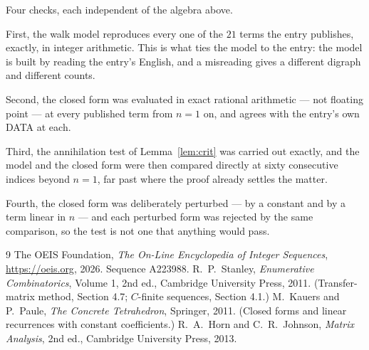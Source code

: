 \documentclass[11pt,a4paper]{article}
\theoremstyle{plain}
\theoremstyle{definition}
\begin{document}
Four checks, each independent of the algebra above.

First, the walk model reproduces every one of the $21$ terms the entry publishes,
exactly, in integer arithmetic. This is what ties the model to the entry: the model is built
by reading the entry's English, and a misreading gives a different digraph and different
counts.

Second, the closed form was evaluated in exact rational arithmetic --- not floating point ---
at every published term from $n=1$ on, and agrees with the entry's own DATA at each.

Third, the annihilation test of Lemma~\ref{lem:crit} was carried out exactly, and the model
and the closed form were then compared directly at sixty consecutive indices beyond
$n=1$, far past where the proof already settles the matter.

Fourth, the closed form was deliberately perturbed --- by a constant and by a term linear in
$n$ --- and each perturbed form was rejected by the same comparison, so the test is not one
that anything would pass.

\begin{thebibliography}{9}
 The OEIS Foundation, \emph{The On-Line Encyclopedia of Integer
Sequences}, \url{https://oeis.org}, 2026. Sequence A223988.
 R.~P.~Stanley, \emph{Enumerative Combinatorics}, Volume 1, 2nd ed.,
Cambridge University Press, 2011. (Transfer-matrix method, Section 4.7; $C$-finite sequences,
Section 4.1.)
 M.~Kauers and P.~Paule, \emph{The Concrete Tetrahedron}, Springer, 2011.
(Closed forms and linear recurrences with constant coefficients.)
 R.~A.~Horn and C.~R.~Johnson, \emph{Matrix Analysis}, 2nd ed., Cambridge
University Press, 2013.
\end{thebibliography}
\end{document}
